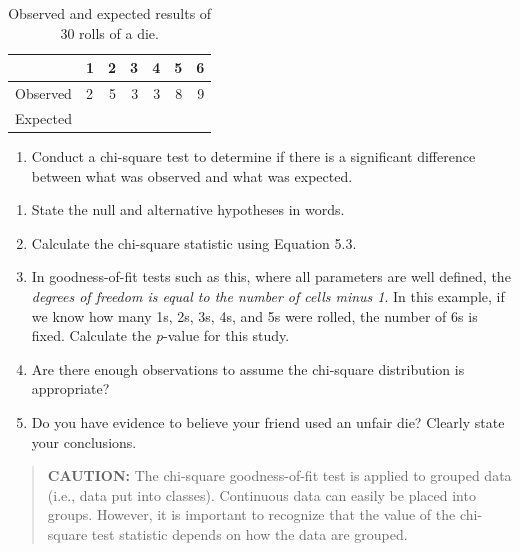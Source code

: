 \documentclass[
]{report}
\providecommand{\tightlist}{%
  \setlength{\itemsep}{0pt}\setlength{\parskip}{0pt}}
\begin{document}
\begin{table}[!h]
\centering
\caption{\label{tab:tab58} Observed and expected results of 30 rolls of a die.}
\centering
\begin{tabular}[t]{llrrrrr}
\toprule
  & 1 & 2 & 3 & 4 & 5 & 6\\
\midrule
Observed & 2 & 5 & 3 & 3 & 8 & 9\\
Expected &  &  &  &  &  & \\
\bottomrule
\end{tabular}
\end{table}

\begin{enumerate}
\def\labelenumi{\arabic{enumi}.}
\setcounter{enumi}{33}
\tightlist
\item
  Conduct a chi-square test to determine if there is a significant difference between what was observed and what was expected.\\
\end{enumerate}

\begin{enumerate}
\def\labelenumi{(\alph{enumi})}
\tightlist
\item
  State the null and alternative hypotheses in words.\\
\item
  Calculate the chi-square statistic using Equation 5.3.\\
\item
  In goodness-of-fit tests such as this, where all parameters are well defined, the \emph{degrees of freedom is equal to the number of cells minus 1}. In this example, if we know how many 1s, 2s, 3s, 4s, and 5s were rolled, the number of 6s is fixed. Calculate the \emph{p}-value for this study.\\
\item
  Are there enough observations to assume the chi-square distribution is appropriate?\\
\item
  Do you have evidence to believe your friend used an unfair die? Clearly state your conclusions.
\end{enumerate}

\begin{quote}
\textbf{CAUTION:}
The chi-square goodness-of-fit test is applied to grouped data (i.e., data put into classes). Continuous data can easily be placed into groups. However, it is important to recognize that the value of the chi-square test statistic depends on how the data are grouped.
\end{quote}
\end{document}
